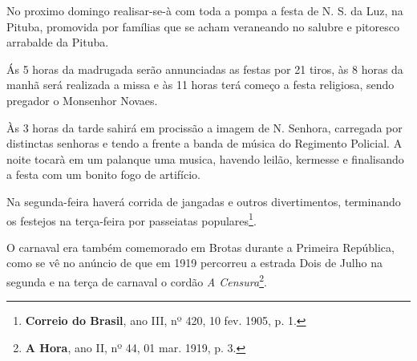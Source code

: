 \begin{citacao}
No proximo domingo realisar-se-à com toda a pompa a festa de N. S. da Luz, na Pituba, promovida por famílias que se acham veraneando no salubre e pitoresco arrabalde da Pituba.

Ás 5 horas da madrugada serão annunciadas as festas por 21 tiros, às 8 horas da manhã será realizada a missa e às 11 horas terá começo a festa religiosa, sendo pregador o Monsenhor Novaes.

Às 3 horas da tarde sahirá em procissão a imagem de N. Senhora, carregada por distinctas senhoras e tendo a frente a banda de música do Regimento Policial. A noite tocarà em um palanque uma musica, havendo leilão, kermesse e finalisando a festa com um bonito fogo de artifício.

Na segunda-feira haverá corrida de jangadas e outros divertimentos, terminando os festejos na terça-feira por passeiatas populares\footnote{\textbf{Correio do Brasil}, ano III, nº 420, 10 fev. 1905, p. 1.}.
\end{citacao}

O carnaval era também comemorado em Brotas durante a Primeira República, como se vê no anúncio de que em 1919 percorreu a estrada Dois de Julho na segunda e na terça de carnaval o cordão \textit{A Censura}\footnote{\textbf{A Hora}, ano II, nº 44, 01 mar. 1919, p. 3.}.